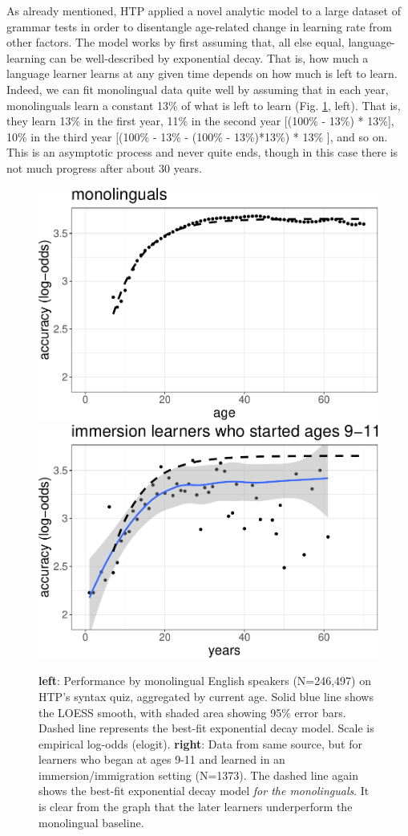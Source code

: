 \documentclass[
  english,
  doc,floatsintext]{apa6}
\begin{document}
As already mentioned, HTP applied a novel analytic model to a large dataset of grammar tests in order to disentangle age-related change in learning rate from other factors. The model works by first assuming that, all else equal, language-learning can be well-described by exponential decay. That is, how much a language learner learns at any given time depends on how much is left to learn. Indeed, we can fit monolingual data quite well by assuming that in each year, monolinguals learn a constant 13\% of what is left to learn (Fig. \ref{fig:exponentials}, left). That is, they learn 13\% in the first year, 11\% in the second year {[}(100\% - 13\%) * 13\%{]}, 10\% in the third year {[}(100\% - 13\% - (100\% - 13\%)*13\%) * 13\% {]}, and so on. This is an asymptotic process and never quite ends, though in this case there is not much progress after about 30 years.



\begin{figure}
\includegraphics[width=0.45\linewidth]{SlikResponse_rmd_files/figure-latex/exponentials-1} \includegraphics[width=0.45\linewidth]{SlikResponse_rmd_files/figure-latex/exponentials-2} \caption{\textbf{left}: Performance by monolingual English speakers (N=246,497) on HTP's syntax quiz, aggregated by current age. Solid blue line shows the LOESS smooth, with shaded area showing 95\% error bars. Dashed line represents the best-fit exponential decay model. Scale is empirical log-odds (elogit). \textbf{right}: Data from same source, but for learners who began at ages 9-11 and learned in an immersion/immigration setting (N=1373). The dashed line again shows the best-fit exponential decay model \emph{for the monolinguals}. It is clear from the graph that the later learners underperform the monolingual baseline.}\label{fig:exponentials}
\end{figure}
\end{document}
